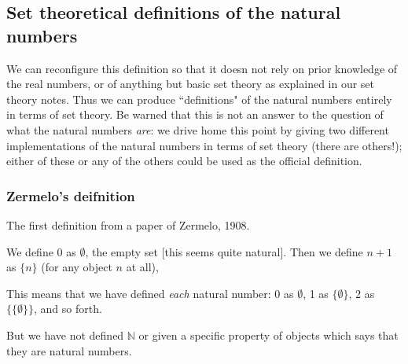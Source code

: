 \documentclass[12pt]{article}
\begin{document}
\subsection{Set theoretical definitions of the natural numbers}

We can reconfigure this definition so that it doesn not rely on prior knowledge of the real numbers, or of anything but basic set theory as explained in our set theory notes.   Thus we can produce ``definitions" of the natural numbers entirely in terms of set theory.  Be warned that this is not an answer to the question of what the natural numbers {\em are\/}:  we drive home this point by giving two different implementations of the natural numbers in terms of set theory (there are others!);  either of these or any of the others could be used as the official definition.

\subsubsection{Zermelo's deifnition}

The first definition from a paper of Zermelo, 1908.

We define 0 as $\emptyset$, the empty set [this seems quite natural].  Then we define $n+1$ as $\{n\}$ (for any object $n$ at all),

This means that we have defined {\em each\/} natural number:  0 as $\emptyset$, 1 as $\{\emptyset\}$, 2 as $\{\{\emptyset\}\}$, and so forth.

But we have not defined $\mathbb N$ or given a specific property of objects which says that they are natural numbers.
\end{document}
